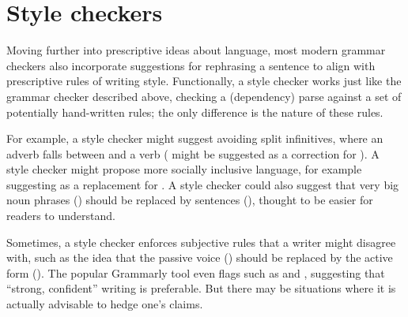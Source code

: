 


\section{Style checkers}
\label{sec:style}

Moving further into prescriptive ideas about language, most modern grammar checkers also incorporate suggestions for rephrasing a sentence to align with prescriptive rules of writing style.  Functionally, a style checker works just like the grammar checker described above, checking a (dependency) parse against a set of potentially hand-written rules; the only difference is the nature of these rules.

For example, a style checker might suggest avoiding split infinitives, where an adverb falls between  and a verb ( might be suggested as a correction for ).  A style checker might propose more socially inclusive language, for example  suggesting  as a replacement for .  A style checker could also suggest that very big noun phrases () should be replaced by sentences (), thought to be easier for readers to understand.

Sometimes, a style checker enforces subjective rules that a writer might  disagree with, such as the idea that the passive voice () should be replaced by the active form ().  The popular Grammarly tool even flags  such as  and , suggesting that ``strong, confident'' writing is preferable.  But there may be situations where it is actually advisable to hedge one's claims.

